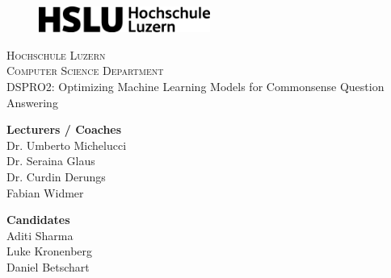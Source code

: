 \documentclass[10.5pt]{article}
\begin{document}
\begin{titlepage}
\begin{figure}[t]
    \centering
    \includegraphics[width=0.5\textwidth]{HSLU2022logo.svg.png}
\end{figure}

\begin{center}
    \textsc{\LARGE{Hochschule Luzern\\}}
    \textsc{\LARGE{Computer Science Department\\}} 
    \vspace{40mm}
    \fontsize{10mm}{7mm}\selectfont 
    \textup{DSPRO2: Optimizing Machine Learning Models for Commonsense Question Answering}\\
\end{center}

\vspace{25mm}

\begin{minipage}[t]{0.47\textwidth}
    \textnormal{\large{\bf Lecturers / Coaches\\}} 
    {\large Dr. Umberto Michelucci\\ 
    Dr. Seraina Glaus\\
    Dr. Curdin Derungs\\
    Fabian Widmer}
\end{minipage}\hfill\begin{minipage}[t]{0.47\textwidth}\raggedleft
    \textnormal{\large{\bf Candidates\\}}
    {\large Aditi Sharma\\
    Luke Kronenberg\\
    Daniel Betschart}
\end{minipage}

\vspace{20mm}


\end{titlepage}
\newpage
\tableofcontents
\newpage
\end{document}
